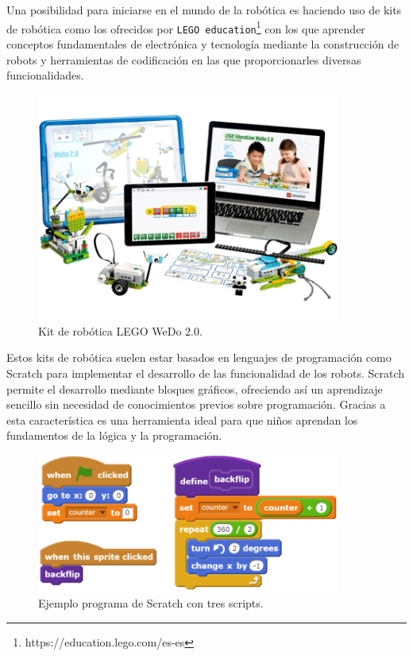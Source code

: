\documentclass[a4paper, 12pt]{book}
\begin{document}
		Una posibilidad para iniciarse en el mundo de la robótica es haciendo uso de kits de robótica como los ofrecidos por \texttt{LEGO education}\footnote{https://education.lego.com/es-es} con los que aprender conceptos fundamentales de electrónica y tecnología mediante la construcción de robots y herramientas de codificación en las que proporcionarles diversas funcionalidades. \\
		
		\begin{figure}[H]
			\centering
			\includegraphics[width=10cm, keepaspectratio]{img/lego.png}
			\caption{Kit de robótica LEGO WeDo 2.0.}
			\label{fig:lego}
		\end{figure}
		
		Estos kits de robótica suelen estar basados en lenguajes de programación como Scratch para implementar el desarrollo de las funcionalidad de los robots. Scratch permite el desarrollo mediante bloques gráficos, ofreciendo así un aprendizaje sencillo sin necesidad de conocimientos previos sobre programación. Gracias a esta característica es una herramienta ideal para que niños aprendan los fundamentos de la lógica y la programación.
		
		\begin{figure}[H]
			\centering
			\includegraphics[width=10cm, keepaspectratio]{img/scratch.png}
			\caption{Ejemplo programa de Scratch con tres scripts.}
			\label{fig:scratch}
		\end{figure}
		
\end{document}
